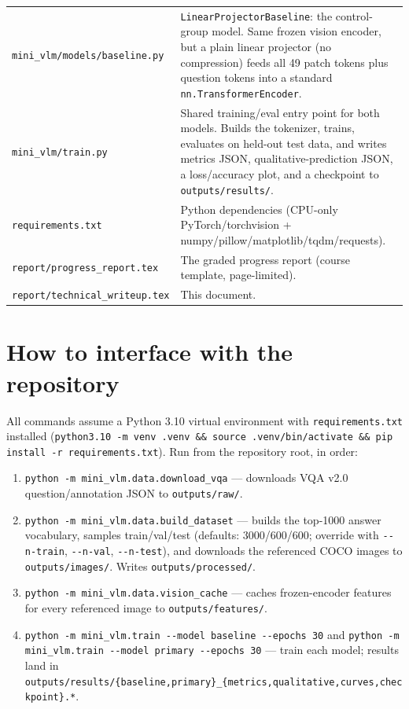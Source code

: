 \documentclass[final]{article}
\begin{document}
\begin{longtable}{p{5.2cm}p{9cm}}
\texttt{mini\_vlm/models/baseline.py} & \texttt{LinearProjectorBaseline}: the control-group model. Same frozen vision encoder, but a plain linear projector (no compression) feeds all 49 patch tokens plus question tokens into a standard \texttt{nn.TransformerEncoder}. \\
\texttt{mini\_vlm/train.py} & Shared training/eval entry point for both models. Builds the tokenizer, trains, evaluates on held-out test data, and writes metrics JSON, qualitative-prediction JSON, a loss/accuracy plot, and a checkpoint to \texttt{outputs/results/}. \\
\texttt{requirements.txt} & Python dependencies (CPU-only PyTorch/torchvision + numpy/pillow/matplotlib/tqdm/requests). \\
\texttt{report/progress\_report.tex} & The graded progress report (course template, page-limited). \\
\texttt{report/technical\_writeup.tex} & This document. \\
\bottomrule
\end{longtable}

\section*{How to interface with the repository}

All commands assume a Python 3.10 virtual environment with \texttt{requirements.txt}
installed (\texttt{python3.10 -m venv .venv \&\& source .venv/bin/activate \&\& pip install -r
requirements.txt}). Run from the repository root, in order:

\begin{enumerate}
  \item \texttt{python -m mini\_vlm.data.download\_vqa} --- downloads VQA v2.0 question/annotation JSON to \texttt{outputs/raw/}.
  \item \texttt{python -m mini\_vlm.data.build\_dataset} --- builds the top-1000 answer vocabulary, samples train/val/test (defaults: 3000/600/600; override with \texttt{-{}-n-train}, \texttt{-{}-n-val}, \texttt{-{}-n-test}), and downloads the referenced COCO images to \texttt{outputs/images/}. Writes \texttt{outputs/processed/}.
  \item \texttt{python -m mini\_vlm.data.vision\_cache} --- caches frozen-encoder features for every referenced image to \texttt{outputs/features/}.
  \item \texttt{python -m mini\_vlm.train -{}-model baseline -{}-epochs 30} and \texttt{python -m mini\_vlm.train -{}-model primary -{}-epochs 30} --- train each model; results land in \texttt{outputs/results/\{baseline,primary\}\_\{metrics,qualitative,curves,checkpoint\}.*}.
\end{enumerate}
\end{document}
